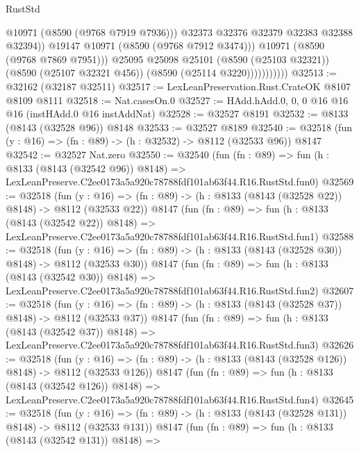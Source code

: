 \begin{lexlean}{RustStd}
\begin{coremodule}
                                @10971
                                (@8590 (@9768 @7919 @7936)))
                              @32373
                              @32376
                              @32379
                              @32383
                              @32388
                              @32394))
                          @19147
                          @10971
                          (@8590 (@9768 @7912 @3474)))
                        @10971
                        (@8590 (@9768 @7869 @7951)))
                      @25095
                      @25098
                      @25101
                      (@8590 (@25103 @32321))
                      (@8590 (@25107 @32321 @456))
                      (@8590 (@25114 @3220)))))))))))
@32513 := @32162 (@32187 @32511)
@32517 := LexLeanPreservation.Rust.CrateOK @8107 @8109 @8111
@32518 := Nat.casesOn.{0}
@32527 := HAdd.hAdd.{0, 0, 0} @16 @16 @16 (instHAdd.{0} @16 instAddNat)
@32528 := @32527 @8191
@32532 := @8133 (@8143 (@32528 @96)) @8148
@32533 := @32527 @8189
@32540 := @32518 (fun (y : @16) => (fn : @89) -> (h : @32532) -> @8112 (@32533 @96)) @8147
@32542 := @32527 Nat.zero
@32550 := @32540
    (fun (fn : @89) =>
    fun (h : @8133 (@8143 (@32542 @96)) @8148) =>
    LexLeanPreserve.C2ee0173a5a920c78788fdf101ab63f44.R16.RustStd.fun0)
@32569 := @32518
    (fun (y : @16) => (fn : @89) -> (h : @8133 (@8143 (@32528 @22)) @8148) -> @8112 (@32533 @22))
    @8147
    (fun (fn : @89) =>
    fun (h : @8133 (@8143 (@32542 @22)) @8148) =>
    LexLeanPreserve.C2ee0173a5a920c78788fdf101ab63f44.R16.RustStd.fun1)
@32588 := @32518
    (fun (y : @16) => (fn : @89) -> (h : @8133 (@8143 (@32528 @30)) @8148) -> @8112 (@32533 @30))
    @8147
    (fun (fn : @89) =>
    fun (h : @8133 (@8143 (@32542 @30)) @8148) =>
    LexLeanPreserve.C2ee0173a5a920c78788fdf101ab63f44.R16.RustStd.fun2)
@32607 := @32518
    (fun (y : @16) => (fn : @89) -> (h : @8133 (@8143 (@32528 @37)) @8148) -> @8112 (@32533 @37))
    @8147
    (fun (fn : @89) =>
    fun (h : @8133 (@8143 (@32542 @37)) @8148) =>
    LexLeanPreserve.C2ee0173a5a920c78788fdf101ab63f44.R16.RustStd.fun3)
@32626 := @32518
    (fun (y : @16) => (fn : @89) -> (h : @8133 (@8143 (@32528 @126)) @8148) -> @8112 (@32533 @126))
    @8147
    (fun (fn : @89) =>
    fun (h : @8133 (@8143 (@32542 @126)) @8148) =>
    LexLeanPreserve.C2ee0173a5a920c78788fdf101ab63f44.R16.RustStd.fun4)
@32645 := @32518
    (fun (y : @16) => (fn : @89) -> (h : @8133 (@8143 (@32528 @131)) @8148) -> @8112 (@32533 @131))
    @8147
    (fun (fn : @89) =>
    fun (h : @8133 (@8143 (@32542 @131)) @8148) =>

\end{coremodule}
\end{lexlean}

